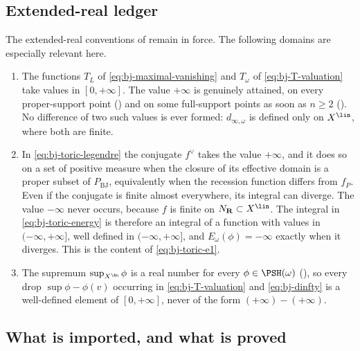 \subsection{Extended-real ledger}
\label{sec:ch49-ledger}

The extended-real conventions of
 remain in force.
The following domains are especially relevant here.

\begin{enumerate}
\item\label{itm:ch49-ledger:T}
      The functions $T_L$ of \eqref{eq:bj-maximal-vanishing} and
      $T_\omega$ of \eqref{eq:bj-T-valuation} take values in
      $[0,+\infty]$.  The value $+\infty$ is genuinely attained, on
      every proper-support point ()
      and on some full-support points as soon as $n\ge2$
      ().  No difference of two such values
      is ever formed: $d_{\infty,\omega}$ is defined only on
      $X^{\lin}$, where both are finite.
\item\label{itm:ch49-ledger:legendre}
      In \eqref{eq:bj-toric-legendre} the conjugate $f^\vee$ takes the
      value $+\infty$, and it does so on a set of positive measure
      when the closure of its effective domain is a proper subset of
      $P_{\mathrm{BJ}}$, equivalently when the recession function differs
      from $f_P$.  Even if the conjugate is finite almost everywhere,
      its integral can diverge.  The value $-\infty$ never occurs, because $f$ is finite on
      $N_{\mathbf R}\subset X^{\lin}$.  The integral in
      \eqref{eq:bj-toric-energy} is therefore an integral of a function
      with values in $(-\infty,+\infty]$, well defined in
      $(-\infty,+\infty]$, and $E_\omega(\phi)=-\infty$ exactly when it
      diverges.  This is the content of \eqref{eq:bj-toric-e1}.
\item\label{itm:ch49-ledger:sup}
      The supremum $\sup_{X^{\An}}\phi$ is a real number for every
      $\phi\in\PSH(\omega)$
      (), so every drop
      $\sup\phi-\phi(v)$ occurring in \eqref{eq:bj-T-valuation} and
      \eqref{eq:bj-dinfty} is a well-defined element of
      $[0,+\infty]$, never of the form $(+\infty)-(+\infty)$.
\end{enumerate}

\subsection{What is imported, and what is proved}
\label{sec:ch49-imported}

